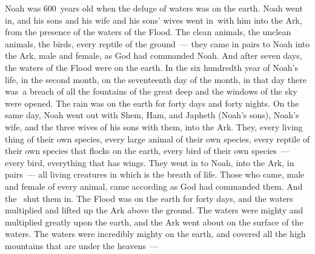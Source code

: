 \begin{inparaenum}
   Noah was 600~years old when the deluge of waters was on the earth.%
   Noah went in, and his sons and his wife and his sons' wives went in\understood{}\ with him into the Ark, from the presence of the waters of the Flood.%
   The clean animals, the unclean animals, the birds, every reptile of the ground~---%
   they came in pairs to Noah into the Ark, male and female, as God had commanded Noah.%
   And after seven days, the waters of the Flood were on the earth.%
   In the six hundredth year of Noah's life, in the second month, on the seventeenth day of the month, in that day there was\understood{}\ a breach of all the fountains of the great deep and the windows of the sky were opened.%
   The rain was on the earth for forty days and forty nights.%
   On the same day, Noah went out with Shem, Ham, and Japheth (Noah's sons), Noah's wife, and the three wives of his sons with them, into the Ark.%
   They, every living thing of their own species, every large animal of their own species, every reptile of their own species that flocks on the earth, every bird of their own species~--- every bird, everything that has wings.%
   They went in to Noah, into the Ark, in pairs~--- all living creatures in which is the breath of life.%
   Those who came, male and female of every animal, came according as God had commanded them. And the \lord\ shut them in.%
   The Flood was on the earth for forty days, and the waters multiplied and lifted up the Ark above the ground.%
   The waters were mighty and multiplied greatly upon the earth, and the Ark went about on the surface of the waters.%
   The waters were incredibly mighty on the earth, and covered all the high mountains that are under the heavens~---%

\end{inparaenum}

